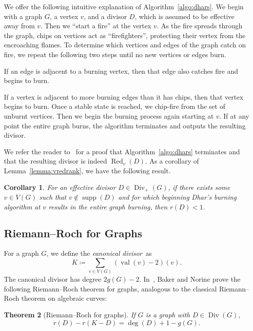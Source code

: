 \documentclass[10pt]{amsart}
\newtheorem{theorem}{Theorem}[section]
\newtheorem{coro}[theorem]{Corollary}
\renewenvironment{enumerate}[1][]{\if\relax\detokenize{#1}\relax\sourceenumerate\else\sourceenumerate[label=#1]\fi}{\endsourceenumerate}
\DeclareMathOperator{\val}{val}
\DeclareMathOperator{\Div}{Div}
\DeclareMathOperator{\supp}{supp}
\DeclareMathOperator{\Red}{Red}
\begin{document}
We offer the following intuitive explanation of Algorithm~\ref{algo:dhars}. We begin with a graph $G$, a vertex $v$, and a divisor $D$, which is assumed to be effective away from $v$. Then we ``start a fire'' at the vertex $v$. 
As the fire spreads through the graph, chips on vertices act as ``firefighters'', protecting their vertex from the encroaching flames. To determine which vertices and edges of the graph catch on fire, we repeat the following two steps until no new vertices or edges burn.
\begin{enumerate}
 \item If an edge is adjacent to a burning vertex, then that edge also catches fire and begins to burn.
 \item If a vertex is adjacent to more burning edges than it has chips, then that vertex begins to burn.
\end{enumerate}
Once a stable state is reached, we chip-fire from the set of unburnt vertices. Then we begin the burning process again starting at $v$. If at any point the entire graph burns, the algorithm terminates and outputs the resulting divisor.

We refer the reader to~\cite{bs} for a proof that Algorithm~\ref{algo:dhars} terminates and that the resulting divisor is indeed $\Red _v(D)$. As a corollary of Lemma~\ref{lemma:vredrank}, we have the following result.

\begin{coro}
\label{lemma:dhars}
For an effective divisor $D \in \Div _+(G)$, if there exists some $v \in V(G)$ such that $v \notin \supp (D)$ and for which beginning Dhar's burning algorithm at $v$ results in the entire graph burning, then $r(D) < 1$.
\end{coro}
\subsection{Riemann--Roch for Graphs}

For a graph $G$, we define the \emph{canonical divisor}~as
\[
K \coloneqq \sum_{v \in V(G)} (\val (v) - 2) (v).
\]
The canonical divisor has degree $2g(G) - 2$. In~\cite{bn}, Baker and Norine prove the following Riemann--Roch theorem for graphs, analogous to the classical Riemann--Roch theorem on algebraic curves:

\begin{theorem}[Riemann--Roch for graphs]
\label{thm:riemannroch}
If $G$ is a graph with $D \in \Div (G)$, 
\[
r(D) - r(K-D) = \deg (D) + 1 - g(G).
\]
\end{theorem}
\end{document}
